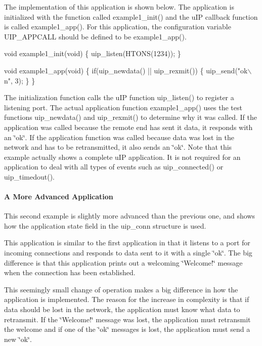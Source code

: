 The implementation of this application is shown below. The application is initialized with the function called example1\+\_\+init() and the u\+IP callback function is called example1\+\_\+app(). For this application, the configuration variable U\+I\+P\+\_\+\+A\+P\+P\+C\+A\+LL should be defined to be example1\+\_\+app().


\begin{DoxyCode}
\textcolor{keywordtype}{void} example1\_init(\textcolor{keywordtype}{void}) \{
   uip\_listen(HTONS(1234));
\}

\textcolor{keywordtype}{void} example1\_app(\textcolor{keywordtype}{void}) \{
   \textcolor{keywordflow}{if}(uip\_newdata() || uip\_rexmit()) \{
      uip\_send(\textcolor{stringliteral}{"ok\(\backslash\)n"}, 3);
   \}
\}
\end{DoxyCode}


The initialization function calls the u\+IP function uip\+\_\+listen() to register a listening port. The actual application function example1\+\_\+app() uses the test functions uip\+\_\+newdata() and uip\+\_\+rexmit() to determine why it was called. If the application was called because the remote end has sent it data, it responds with an \char`\"{}ok\char`\"{}. If the application function was called because data was lost in the network and has to be retransmitted, it also sends an \char`\"{}ok\char`\"{}. Note that this example actually shows a complete u\+IP application. It is not required for an application to deal with all types of events such as uip\+\_\+connected() or uip\+\_\+timedout().\hypertarget{a00074_example2}{}\paragraph{A More Advanced Application}\label{a00074_example2}
This second example is slightly more advanced than the previous one, and shows how the application state field in the uip\+\_\+conn structure is used.

This application is similar to the first application in that it listens to a port for incoming connections and responds to data sent to it with a single \char`\"{}ok\char`\"{}. The big difference is that this application prints out a welcoming \char`\"{}\+Welcome!\char`\"{} message when the connection has been established.

This seemingly small change of operation makes a big difference in how the application is implemented. The reason for the increase in complexity is that if data should be lost in the network, the application must know what data to retransmit. If the \char`\"{}\+Welcome!\char`\"{} message was lost, the application must retransmit the welcome and if one of the \char`\"{}ok\char`\"{} messages is lost, the application must send a new \char`\"{}ok\char`\"{}.


